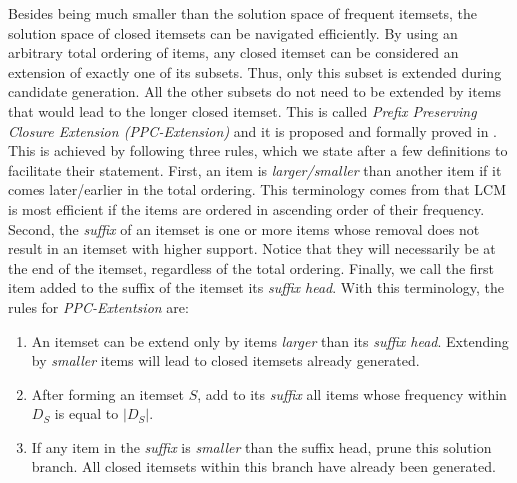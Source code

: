 \documentclass{sig-alternate}
\begin{document}
Besides being much smaller than the solution space of frequent itemsets, the solution space of closed itemsets can be navigated efficiently. By using an arbitrary total ordering of items, any closed itemset can be considered an extension of exactly one of its subsets. Thus, only this subset is extended during candidate generation. All the other subsets do not need to be extended by items that would lead to the longer closed itemset.  This is called \emph{Prefix Preserving Closure Extension (PPC-Extension)} and it is proposed and formally proved in \cite{uno2004lcm}. This is achieved by following three rules, which we state after a few definitions to facilitate their statement. First, an item is \emph{larger/smaller} than another item if it comes later/earlier in the total ordering. This terminology comes from that LCM is most efficient if the items are ordered in ascending order of their frequency. Second, the \emph{suffix} of an itemset is one or more items whose removal does not result in an itemset with higher support. Notice that they will necessarily be at the end of the itemset, regardless of the total ordering. Finally, we call the first item added to the suffix of the itemset its \emph{suffix head}. With this terminology, the rules for \emph{PPC-Extentsion} are:
\begin{enumerate}
\item An itemset can be extend only by items \emph{larger} than its \emph{suffix head}. Extending by \emph{smaller} items will lead to closed itemsets already generated.
\item After forming an itemset $S$, add to its \emph{suffix} all items whose frequency within $D_S$ is equal to $|D_S|$. %
\item If any item in the \emph{suffix} is \emph{smaller} than the suffix head, prune this solution branch. All closed itemsets within this branch have already been generated.
\end{enumerate}
 
\end{document}
